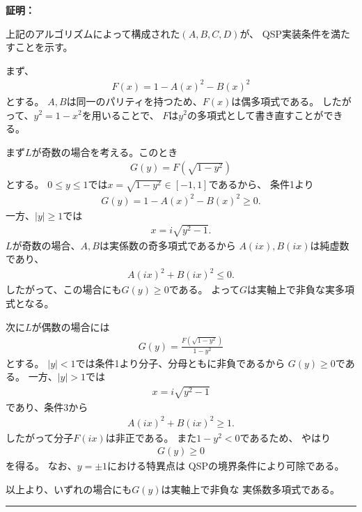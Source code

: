 \documentclass[a4paper,10.5pt]{article}
\numberwithin{equation}{section}
\newenvironment{proofbox}
{\begin{prooflabel}\textbf{証明：}\end{prooflabel}\vspace{0.8em}}
{\par\vspace{1em}\hrule\vspace{1em}}
\begin{document}
\begin{proofbox}
    上記のアルゴリズムによって構成された$(A,B,C,D)$が、
    QSP実装条件を満たすことを示す。

    まず、
    \begin{align*}
        F(x)=1-A(x)^2-B(x)^2
    \end{align*}
    とする。
    $A,B$は同一のパリティを持つため、$F(x)$は偶多項式である。
    したがって、$y^2=1-x^2$を用いることで、
    $F$は$y^2$の多項式として書き直すことができる。

    まず$L$が奇数の場合を考える。このとき
    \begin{align*}
        G(y)=F\!\left(\sqrt{1-y^2}\right)
    \end{align*}
    とする。
    $0\leq y\leq1$では$x=\sqrt{1-y^2}\in[-1,1]$であるから、
    条件1より
    \begin{align*}
        G(y)=1-A(x)^2-B(x)^2\geq0.
    \end{align*}
    一方、$|y|\geq1$では
    \begin{align*}
        x=i\sqrt{y^2-1}.
    \end{align*}
    $L$が奇数の場合、$A,B$は実係数の奇多項式であるから
    $A(ix),B(ix)$は純虚数であり、
    \begin{align*}
        A(ix)^2+B(ix)^2\leq0.
    \end{align*}
    したがって、この場合にも$G(y)\geq0$である。
    よって$G$は実軸上で非負な実多項式となる。

    次に$L$が偶数の場合には
    \begin{align*}
        G(y)
        =
        \frac{
        F\!\left(\sqrt{1-y^2}\right)
        }{1-y^2}
    \end{align*}
    とする。
    $|y|<1$では条件1より分子、分母ともに非負であるから
    $G(y)\geq0$である。
    一方、$|y|>1$では
    \begin{align*}
        x=i\sqrt{y^2-1}
    \end{align*}
    であり、条件3から
    \begin{align*}
        A(ix)^2+B(ix)^2\geq1.
    \end{align*}
    したがって分子$F(ix)$は非正である。
    また$1-y^2<0$であるため、
    やはり
    \begin{align*}
        G(y)\geq0
    \end{align*}
    を得る。
    なお、$y=\pm1$における特異点は
    QSPの境界条件により可除である。

    以上より、いずれの場合にも$G(y)$は実軸上で非負な
    実係数多項式である。


\end{proofbox}
\end{document}
